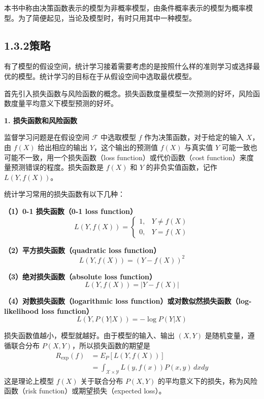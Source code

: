\documentclass[UTF8,12pt,a4paper,fontset=fandol]{ctexart}
\begin{document}
本书中称由决策函数表示的模型为非概率模型，由条件概率表示的模型为概率模型。为了简便起见，当论及模型时，有时只用其中一种模型。

\subsection*{1.3.2\quad 策略}

有了模型的假设空间，统计学习接着需要考虑的是按照什么样的准则学习或选择最优的模型。统计学习的目标在于从假设空间中选取最优模型。

首先引入损失函数与风险函数的概念。损失函数度量模型一次预测的好坏，风险函数度量平均意义下模型预测的好坏。

\noindent\textbf{1. 损失函数和风险函数}

监督学习问题是在假设空间 $\mathcal F$ 中选取模型 $f$ 作为决策函数，对于给定的输入 $X$，由 $f(X)$ 给出相应的输出 $Y$，这个输出的预测值 $f(X)$ 与真实值 $Y$ 可能一致也可能不一致，用一个损失函数（loss function）或代价函数（cost function）来度量预测错误的程度。损失函数是 $f(X)$ 和 $Y$ 的非负实值函数，记作 $L(Y,f(X))$。

统计学习常用的损失函数有以下几种：

\noindent\textbf{（1）0-1 损失函数（0-1 loss function）}
\begin{equation}
  L(Y,f(X))=
  \begin{cases}
    1, & Y\ne f(X)\\
    0, & Y=f(X)
  \end{cases}
  \tag{1.9}
\end{equation}

\noindent\textbf{（2）平方损失函数（quadratic loss function）}
\begin{equation}
  L(Y,f(X))=(Y-f(X))^2
  \tag{1.10}
\end{equation}

\noindent\textbf{（3）绝对损失函数（absolute loss function）}
\begin{equation}
  L(Y,f(X))=|Y-f(X)|
  \tag{1.11}
\end{equation}

\noindent\textbf{（4）对数损失函数（logarithmic loss function）或对数似然损失函数（log-likelihood loss function）}
\begin{equation}
  L(Y,P(Y|X))=-\log P(Y|X)
  \tag{1.12}
\end{equation}

损失函数值越小，模型就越好。由于模型的输入、输出 $(X,Y)$ 是随机变量，遵循联合分布 $P(X,Y)$，所以损失函数的期望是
\begin{equation}
\begin{aligned}
  R_{\exp}(f)
  &=E_P[L(Y,f(X))]\\
  &=\int_{\mathcal X\times\mathcal Y} L(y,f(x))P(x,y)\,dxdy
\end{aligned}
  \tag{1.13}
\end{equation}
这是理论上模型 $f(X)$ 关于联合分布 $P(X,Y)$ 的平均意义下的损失，称为风险函数（risk function）或期望损失（expected loss）。
\end{document}
